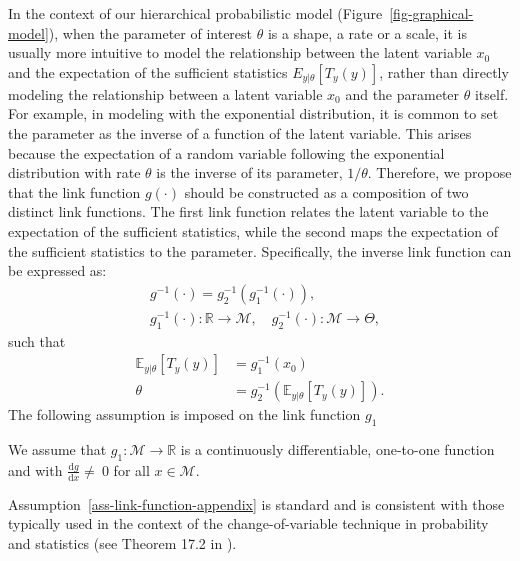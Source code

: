 In the context of our hierarchical probabilistic model (Figure~\ref{fig-graphical-model}), when the parameter of interest $\theta$ is a shape, a rate or a scale, it is usually more intuitive to model the relationship between the latent variable $x_0$ and the expectation of the sufficient statistics $E_{y|\theta}[T_y(y)]$, rather than directly modeling the relationship between a latent variable $x_0$ and the parameter $\theta$ itself.
For example, in modeling with the exponential distribution, it is common to set the parameter as the inverse of a function of the latent variable. This arises because the expectation of a random variable following the exponential distribution with rate $\theta$ is the inverse of its parameter, $1/\theta$.
Therefore, we propose that the link function $g(\cdot)$ should be constructed as a composition of two distinct link functions. The first link function relates the latent variable to the expectation of the sufficient statistics, while the second maps the expectation of the sufficient statistics to the parameter. Specifically, the inverse link function can be expressed as:
\begin{align*}
    &g^{-1}(\cdot) = g_2^{-1}(g_1^{-1}(\cdot)),  \\
    &g_1^{-1}(\cdot) : \mathbb{R} \to \mathcal{M}, \quad g_2^{-1}(\cdot) : \mathcal{M} \to \Theta, 
\end{align*}
such that
\begin{align*}
    \mathbb{E}_{y|\theta}[T_y(y)] &= g_1^{-1}(x_0)\\
    \theta &= g_2^{-1}\left(\mathbb{E}_{y|\theta}[T_y(y)]\right).
\end{align*}
The following assumption is imposed on the link function $g_1$
\begin{assumption}
\label{ass-link-function-appendix}
    We assume that $g_1: \mathcal{M} \to \mathbb{R}$ is a continuously differentiable, one-to-one function and with $\frac{\mathrm{d}g}{\mathrm{d}x}\neq~0$ for all $x\in\mathcal{M}$.
\end{assumption}
Assumption~\ref{ass-link-function-appendix} is standard and is consistent with those typically used in the context of the change-of-variable technique in probability and statistics (see Theorem 17.2 in \cite{billingsley_prob}).
